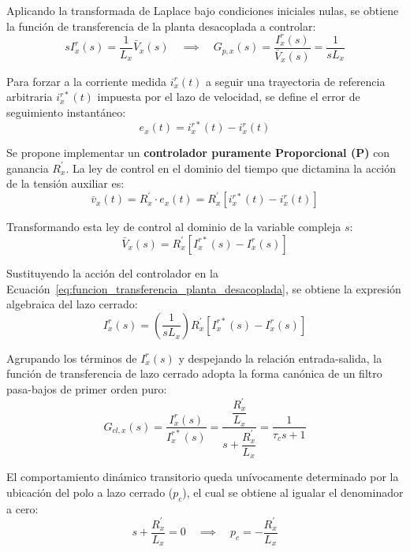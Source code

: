 \documentclass[10pt,a4paper]{article}
\begin{document}
Aplicando la transformada de Laplace bajo condiciones iniciales nulas, se obtiene la función de transferencia de la planta desacoplada a controlar:
\begin{equation}
    s I_x^r(s) = \frac{1}{L_x} \bar{V}_x(s) \quad \implies \quad G_{p,x}(s) = \frac{I_x^r(s)}{\bar{V}_x(s)} = \frac{1}{s L_x}
	\label{eq:funcion_transferencia_planta_desacoplada}
\end{equation}

Para forzar a la corriente medida $i_x^r(t)$ a seguir una trayectoria de referencia arbitraria $i_x^{r*}(t)$ impuesta por el lazo de velocidad, se define el error de seguimiento instantáneo:
\begin{equation*}
    e_x(t) = i_x^{r*}(t) - i_x^r(t)
\end{equation*}

Se propone implementar un \textbf{controlador puramente Proporcional (P)} con ganancia $R_x^\prime$. La ley de control en el dominio del tiempo que dictamina la acción de la tensión auxiliar es:
\begin{equation*}
    \bar{v}_x(t) = R_x^\prime \cdot e_x(t) = R_x^\prime \left[ i_x^{r*}(t) - i_x^r(t) \right]
\end{equation*}

Transformando esta ley de control al dominio de la variable compleja $s$:
\begin{equation*}
    \bar{V}_x(s) = R_x^\prime \left[ I_x^{r*}(s) - I_x^r(s) \right]
\end{equation*}

Sustituyendo la acción del controlador en la Ecuación~\eqref{eq:funcion_transferencia_planta_desacoplada}, se obtiene la expresión algebraica del lazo cerrado:
\begin{equation*}
    I_x^r(s) = \left( \frac{1}{s L_x} \right) R_x^\prime \left[ I_x^{r*}(s) - I_x^r(s) \right]
\end{equation*}

Agrupando los términos de $I_x^r(s)$ y despejando la relación entrada-salida, la función de transferencia de lazo cerrado adopta la forma canónica de un filtro pasa-bajos de primer orden puro:
\begin{equation}
    G_{cl,x}(s) = \frac{I_x^r(s)}{I_x^{r*}(s)} = \frac{ \dfrac{R_x^\prime}{L_x} }{ s + \dfrac{R_x^\prime}{L_x} } = \frac{1}{\tau_c s + 1}
    \label{eq:lazo_cerrado_corriente_PT}
\end{equation}

El comportamiento dinámico transitorio queda unívocamente determinado por la ubicación del polo a lazo cerrado ($p_c$), el cual se obtiene al igualar el denominador a cero:
\begin{equation}
    s + \frac{R_x^\prime}{L_x} = 0 \quad \implies \quad p_c = -\frac{R_x^\prime}{L_x}
\end{equation}
\end{document}
